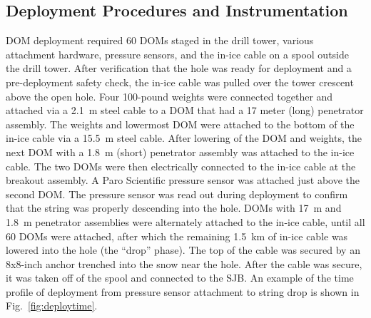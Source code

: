 
\subsection{\label{sec:deployment_inst}Deployment Procedures and Instrumentation}

DOM deployment required 60 DOMs staged in the drill tower, various
attachment hardware, pressure sensors, and the in-ice cable on a spool
outside the drill tower. After verification that the hole was 
ready for deployment and a pre-deployment safety check, the in-ice cable
was pulled over the tower crescent above the open hole. Four 100-pound
weights were connected together and attached via a 2.1~m steel cable to a
DOM that had a 17 meter (long) penetrator assembly. The weights and
lowermost DOM were attached to the bottom of the in-ice cable via a 15.5~m
steel cable. After lowering of the DOM and weights, the next DOM with a
1.8~m (short) penetrator assembly was attached to the in-ice cable. The two DOMs were
then electrically connected to the in-ice cable at the breakout assembly. A
Paro Scientific pressure sensor was attached just above the second DOM. The
pressure sensor was read out during deployment to confirm that the string
was properly descending into the hole.   DOMs with 17~m and
1.8~m penetrator assemblies were alternately attached to the in-ice 
cable, until all 60 DOMs were attached, after which the remaining 1.5~km of
in-ice cable was lowered into the hole (the ``drop'' phase). The top of the
cable was secured by an 8x8-inch anchor trenched into the snow near the hole. After the
cable was secure, it was taken off of the spool and connected to the
SJB. An example of the time profile of deployment from pressure sensor
attachment to string drop is shown in Fig.~\ref{fig:deploytime}.

